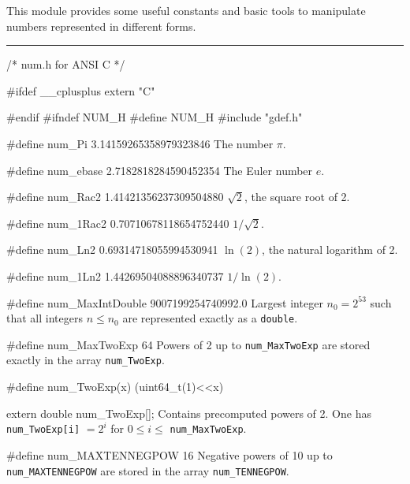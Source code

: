 
This module provides some useful constants and basic tools to
manipulate numbers represented in different forms.

\bigskip\hrule

\code\hide
/* num.h for ANSI C */

#ifdef __cplusplus
extern "C" {
#endif
#ifndef NUM_H
#define NUM_H
\endhide
#include "gdef.h"
\endcode

\code

#define num_Pi     3.14159265358979323846
\endcode
  \tab The number $\pi$.
  \endtab
\code

#define num_ebase  2.7182818284590452354
\endcode
  \tab The Euler number $e$.
  \endtab
\code

#define num_Rac2   1.41421356237309504880
\endcode
  \tab $\sqrt{2}$, the square root of 2.
  \endtab
\code

#define num_1Rac2  0.70710678118654752440
\endcode
  \tab $1/\sqrt{2}$.
  \endtab
\code

#define num_Ln2    0.69314718055994530941
\endcode
  \tab $\ln(2)$, the natural logarithm of 2.
  \endtab
\code

#define num_1Ln2   1.44269504088896340737
\endcode
  \tab $1 / \ln(2)$.
  \endtab
\code

#define num_MaxIntDouble   9007199254740992.0
\endcode
  \tab Largest integer $n_0 = 2^{53}$ such that all integers
  $n \le n_0$ are represented  exactly as a {\tt double}.
  \endtab


\code

#define num_MaxTwoExp   64
\endcode
  \tab Powers of 2 up to {\tt num\_MaxTwoExp} are stored exactly
  in the array {\tt num\_TwoExp}.
  \endtab
\code

#define num_TwoExp(x) (uint64_t(1)<<x)

extern double num_TwoExp[];
\endcode
  \tab  Contains precomputed powers of 2.
  One has {\tt num\_TwoExp[i]} $= 2^i$ for $0 \le i \le$ {\tt num\_MaxTwoExp}.
\endtab
\code

#define num_MAXTENNEGPOW   16
\endcode
  \tab Negative powers of 10 up to {\tt num\_MAXTENNEGPOW} are stored
  in the array {\tt num\_TENNEGPOW}.
  \endtab
\code

}
